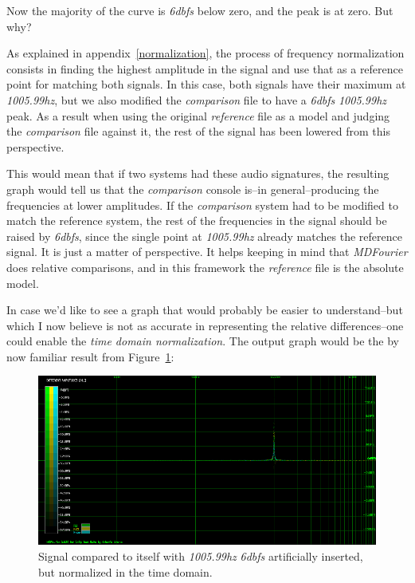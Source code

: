 \documentclass[10pt,a4paper]{report}
\newcommand{\hz}[1]{\textit{\mbox{#1\acrshort{hz}}}}
\newcommand{\db}[1]{\textit{\mbox{#1\acrshort{dbfs}}}}
\begin{document}
\begin{appendices}
Now the majority of the curve is \db{6} below zero, and the peak is at zero. But  why?

As explained in appendix~\ref{normalization}, the process of frequency normalization consists in finding the highest amplitude in the signal and use that as a reference point for matching both signals. In this case, both signals have their maximum at \hz{1005.99}, but we also modified the \textit{comparison} file to have a \db{6} \hz{1005.99} peak. As a result when using the original \textit{reference} file as a model and judging the \textit{comparison} file against it, the rest of the signal has been lowered from this perspective.

This would mean that if two systems had these audio signatures, the resulting graph would tell us that the \textit{comparison} console is--in general--producing the frequencies at lower amplitudes. If the \textit{comparison} system had to be modified to match the reference system, the rest of the frequencies in the signal should be raised by \db{6}, since the single point at \hz{1005.99} already matches the reference signal. It is just a matter of perspective. It helps keeping in mind that \textit{MDFourier} does relative comparisons, and in this framework the \textit{reference} file is the absolute model.

In case we'd like to see a graph that would probably be easier to understand--but which I now believe is not as accurate in representing the relative differences--one could enable the \textit{time domain normalization}. The output graph would be the by now  familiar result from Figure~\ref{fig:corner3}:

\begin{figure}[H]
	\centering
	\includegraphics[width=1.0\linewidth]{images/corner/plot3.png}
	\caption[Corner Case 3]{Signal compared to itself with \hz{1005.99} \db{6} artificially inserted, but normalized in the time domain.}
	\label{fig:corner3}
\end{figure}


\end{appendices}
\end{document}
